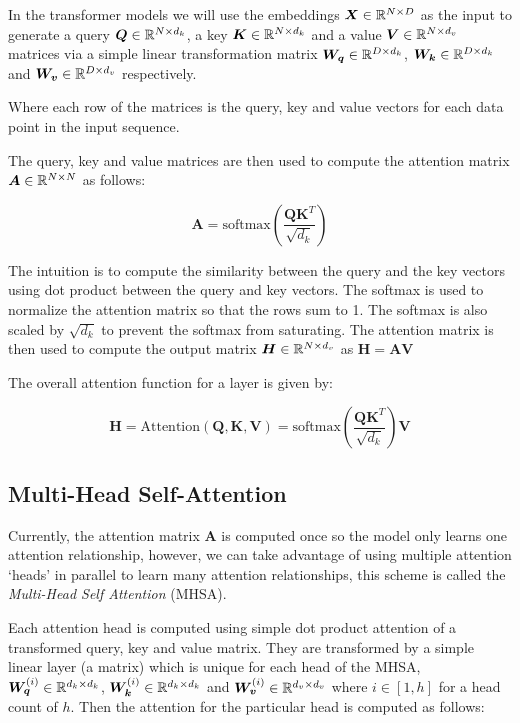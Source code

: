 \documentclass[../../main.tex]{subfiles}
\begin{document}
In the transformer models we will use the embeddings $\bm{X} \in \mathbb{R}^{N \times D}$ as the input to generate a query $\bm{Q} \in \mathbb{R}^{N \times d_k}$, a key $\bm{K} \in \mathbb{R}^{N \times d_k}$ and a value $\bm{V} \in \mathbb{R}^{N \times d_v}$ matrices via a simple linear transformation matrix $\bm{W_q} \in \mathbb{R}^{D \times d_k}$, $\bm{W_k} \in \mathbb{R}^{D \times d_k}$ and $\bm{W_v} \in \mathbb{R}^{D \times d_v}$ respectively. 

Where each row of the matrices is the query, key and value vectors for each data point in the input sequence. 

The query, key and value matrices are then used to compute the attention matrix $\bm{A} \in \mathbb{R}^{N \times N}$ as follows:

\begin{equation}
    \bm{A} = \text{softmax}\left(\frac{\bm{Q}\bm{K}^T}{\sqrt{d_k}}\right)
\end{equation}

\noi The intuition is to compute the similarity between the query and the key vectors using dot product between the query and key vectors. The softmax is used to normalize the attention matrix so that the rows sum to 1. The softmax is also scaled by $\sqrt{d_k}$ to prevent the softmax from saturating. The attention matrix is then used to compute the output matrix $\bm{H} \in \mathbb{R}^{N \times d_v}$ as $\bm{H} = \bm{A}\bm{V}$

The overall attention function for a layer is given by:

\begin{equation}
    \bm{H} =\text{Attention}(\bm{Q}, \bm{K}, \bm{V}) = \text{softmax}\left(\frac{\bm{Q}\bm{K}^T}{\sqrt{d_k}}\right)\bm{V}
\end{equation}

\subsection{Multi-Head Self-Attention}

Currently, the attention matrix $\bm{A}$ is computed once so the model only learns one attention relationship, however, we can take advantage of using multiple attention `heads' in parallel to learn many attention relationships, this scheme is called the \emph{Multi-Head Self Attention} (MHSA). 

Each attention head is computed using simple dot product attention of a transformed query, key and value matrix. They are transformed by a simple linear layer (a matrix) which is unique for each head of the MHSA, $\bm{W_q}^{(i)} \in \mathbb{R}^{d_k \times d_k}$, $\bm{W_k}^{(i)} \in \mathbb{R}^{d_k \times d_k}$ and $\bm{W_v}^{(i)} \in \mathbb{R}^{d_v \times d_v}$ where $i \in [1, h]$ for a head count of $h$. Then the attention for the particular head is computed as follows:
\end{document}
